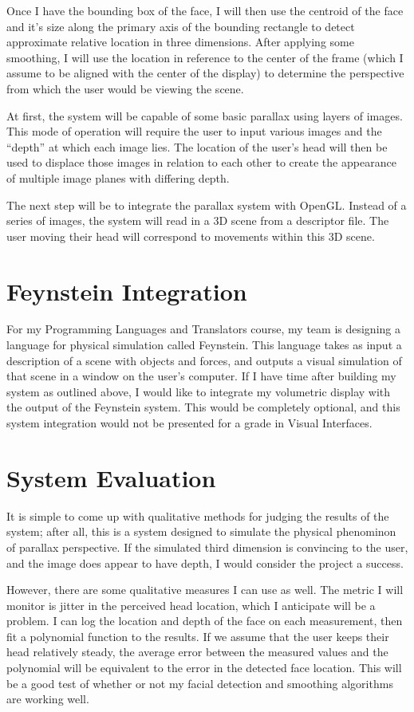 Once I have the bounding box of the face, I will then use the centroid
of the face and it's size along the primary axis of the bounding
rectangle to detect approximate relative location in three
dimensions. After applying some smoothing, I will use the location in
reference to the center of the frame (which I assume to be aligned
with the center of the display) to determine the perspective from
which the user would be viewing the scene.

At first, the system will be capable of some basic parallax using
layers of images. This mode of operation will require the user to
input various images and the ``depth'' at which each image lies. The
location of the user's head will then be used to displace those images
in relation to each other to create the appearance of multiple image
planes with differing depth.

The next step will be to integrate the parallax system with
OpenGL. Instead of a series of images, the system will read in a 3D
scene from a descriptor file. The user moving their head will
correspond to movements within this 3D scene. 

\section{Feynstein Integration}
For my Programming Languages and Translators course, my team is
designing a language for physical simulation called Feynstein. This
language takes as input a description of a scene with objects and
forces, and outputs a visual simulation of that scene in a window on
the user's computer. If I have time after building my system as
outlined above, I would like to integrate my volumetric display with
the output of the Feynstein system. This would be completely optional,
and this system integration would not be presented for a grade in
Visual Interfaces.

\section{System Evaluation}
It is simple to come up with qualitative methods for judging the results
of the system; after all, this is a system designed to simulate the
physical phenominon of parallax perspective. If the simulated third
dimension is convincing to the user, and the image does appear to have
depth, I would consider the project a success. 

However, there are some qualitative measures I can use as well. The
metric I will monitor is jitter in the perceived head location, which
I anticipate will be a problem. I can log the location and depth of
the face on each measurement, then fit a polynomial function to the
results. If we assume that the user keeps their head relatively
steady, the average error between the measured values and the
polynomial will be equivalent to the error in the detected face
location. This will be a good test of whether or not my facial
detection and smoothing algorithms are working well.

